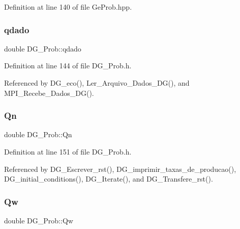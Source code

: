 Definition at line 140 of file Ge\+Prob.\+hpp.

\mbox{\label{classDG__Prob_a0070c89a21c00ffd82d84418b394308b}} 
\subsubsection{\texorpdfstring{qdado}{qdado}}
{\footnotesize\ttfamily double D\+G\+\_\+\+Prob\+::qdado\hspace{0.3cm}{\ttfamily [private]}}



Definition at line 144 of file D\+G\+\_\+\+Prob.\+h.



Referenced by D\+G\+\_\+eco(), Ler\+\_\+\+Arquivo\+\_\+\+Dados\+\_\+\+D\+G(), and M\+P\+I\+\_\+\+Recebe\+\_\+\+Dados\+\_\+\+D\+G().

\mbox{\label{classDG__Prob_ab0aa6693ee2206486978b809517c982f}} 
\subsubsection{\texorpdfstring{Qn}{Qn}}
{\footnotesize\ttfamily double D\+G\+\_\+\+Prob\+::\+Qn\hspace{0.3cm}{\ttfamily [private]}}



Definition at line 151 of file D\+G\+\_\+\+Prob.\+h.



Referenced by D\+G\+\_\+\+Escrever\+\_\+rst(), D\+G\+\_\+imprimir\+\_\+taxas\+\_\+de\+\_\+producao(), D\+G\+\_\+initial\+\_\+conditions(), D\+G\+\_\+\+Iterate(), and D\+G\+\_\+\+Transfere\+\_\+rst().

\mbox{\label{classDG__Prob_a23d1f5768b5c7f9336dfb99eef9c9a61}} 
\subsubsection{\texorpdfstring{Qw}{Qw}}
{\footnotesize\ttfamily double D\+G\+\_\+\+Prob\+::\+Qw\hspace{0.3cm}{\ttfamily [private]}}




